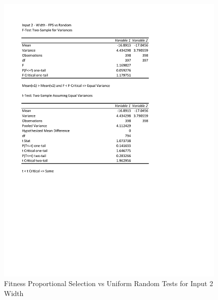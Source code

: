 \documentclass[times]{article}
\begin{document}
	\begin{figure}
		\caption{Fitness Proportional Selection vs Uniform Random Tests for Input 2 Width}
		\label{fig:2parent3_moea}
		\includegraphics[width=\textwidth]{./t_test/2_parent3_moea.pdf}
	\end{figure}
\end{document}
